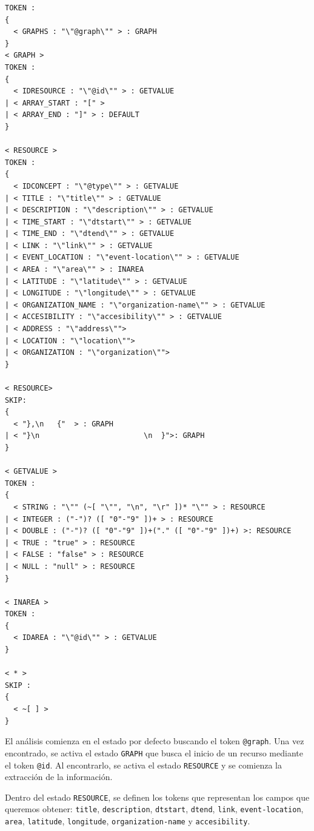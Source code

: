 \begin{lstlisting}
TOKEN :
{
  < GRAPHS : "\"@graph\"" > : GRAPH
}
< GRAPH > 
TOKEN :
{
  < IDRESOURCE : "\"@id\"" > : GETVALUE
| < ARRAY_START : "[" >
| < ARRAY_END : "]" > : DEFAULT
} 

< RESOURCE >
TOKEN :
{
  < IDCONCEPT : "\"@type\"" > : GETVALUE
| < TITLE : "\"title\"" > : GETVALUE
| < DESCRIPTION : "\"description\"" > : GETVALUE
| < TIME_START : "\"dtstart\"" > : GETVALUE
| < TIME_END : "\"dtend\"" > : GETVALUE
| < LINK : "\"link\"" > : GETVALUE
| < EVENT_LOCATION : "\"event-location\"" > : GETVALUE
| < AREA : "\"area\"" > : INAREA
| < LATITUDE : "\"latitude\"" > : GETVALUE
| < LONGITUDE : "\"longitude\"" > : GETVALUE
| < ORGANIZATION_NAME : "\"organization-name\"" > : GETVALUE
| < ACCESIBILITY : "\"accesibility\"" > : GETVALUE
| < ADDRESS : "\"address\"">
| < LOCATION : "\"location\"">
| < ORGANIZATION : "\"organization\"">
}

< RESOURCE>
SKIP:
{
  < "},\n	{"  > : GRAPH
| < "}\n						\n	}">: GRAPH
}

< GETVALUE >
TOKEN :
{
  < STRING : "\"" (~[ "\"", "\n", "\r" ])* "\"" > : RESOURCE
| < INTEGER : ("-")? ([ "0"-"9" ])+ > : RESOURCE
| < DOUBLE : ("-")? ([ "0"-"9" ])+("." ([ "0"-"9" ])+) >: RESOURCE
| < TRUE : "true" > : RESOURCE
| < FALSE : "false" > : RESOURCE
| < NULL : "null" > : RESOURCE
}

< INAREA >
TOKEN :
{
  < IDAREA : "\"@id\"" > : GETVALUE
}

< * >
SKIP :
{
  < ~[ ] >
}
\end{lstlisting}


El análisis comienza en el estado por defecto buscando el token \lstinline|@graph|. Una vez encontrado, se activa el estado \lstinline|GRAPH| que busca el inicio de un recurso mediante el token \lstinline|@id|. Al encontrarlo, se activa el estado \lstinline|RESOURCE| y se comienza la extracción de la información.

\lstset{inputencoding=utf8/latin1}


Dentro del estado \lstinline{RESOURCE}, se definen los tokens que representan los campos que queremos obtener: \lstinline{title}, \lstinline{description}, \lstinline{dtstart}, \lstinline{dtend}, \lstinline{link}, \lstinline{event-location}, \lstinline{area}, \lstinline{latitude}, \lstinline{longitude}, \lstinline{organization-name} y \lstinline{accesibility}.


